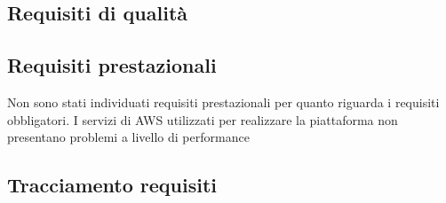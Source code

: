 \subsection{Requisiti di qualità}

\subsection{Requisiti prestazionali}
    Non sono stati individuati requisiti prestazionali per quanto riguarda i requisiti obbligatori. I servizi di    AWS utilizzati per realizzare la piattaforma non presentano problemi a livello di performance
\subsection{Tracciamento requisiti}